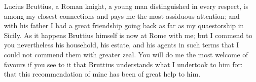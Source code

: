 

 Lucius Bruttius, a Roman knight, a young man distinguished in every respect, is among my closest connections and pays me the most assiduous attention; and with his father I had a great friendship going back as far as my quaestorship in Sicily. As it happens Bruttius himself is now at Rome with me; but I commend to you nevertheless his household, his estate, and his agents in such terms that I could not commend them with greater zeal. You will do me the most welcome of favours if you see to it that Bruttius understands what I undertook to him for: that this recommendation of mine has been of great help to him.
